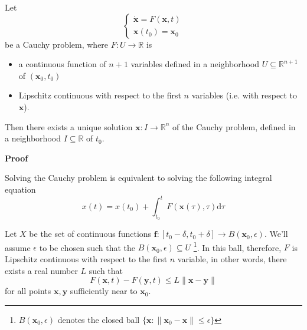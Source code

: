 \documentclass[12pt]{article}
\def\reals{\mathbb{R}}
\def\v#1{\mathbf{#1}}
\def\vdot#1{\mathbf{\dot{#1}}}
\def\d{\mathrm{d}}
\def\norm#1{\|#1\|}
\def\eps{\epsilon}
\begin{document}
Let
$$\begin{cases}\vdot x = F(\v x, t) \\ \v x(t_0) = \v x_0\end{cases}$$
be a Cauchy problem, where $F : U \to \reals$ is
\begin{itemize}
\item a continuous function of $n+1$ variables defined in a neighborhood $U \subseteq \reals^{n+1}$ of $(\v x_0, t_0)$
\item Lipschitz continuous with respect to the first $n$ variables (i.e. with respect to $\v x$).
\end{itemize}

Then there exists a unique solution $\v x : I \to \reals^n$ of the Cauchy problem, defined in a neighborhood $I \subseteq \reals$ of $t_0$.

{\bf Proof}

Solving the Cauchy problem is equivalent to solving the following integral equation
$$x(t) = x(t_0) + \int_{t_0}^{t} F(\v x(\tau), \tau) \d\tau$$

Let $X$ be the set of continuous functions $\v f : [t_0 - \delta, t_0 + \delta] \to B(\v x_0, \eps)$. We'll assume $\eps$ to be chosen such that the $B(\v x_0, \eps) \subseteq U$ \footnote{$B(\v x_0, \eps)$ denotes the closed ball $\{ \v x : \norm{\v x_0 - \v x} \leq \eps \}$}. In this ball, therefore, $F$ is Lipschitz continuous with respect to the first $n$ variable, in other words, there exists a real number $L$ such that
$${F(\v x, t) - F(\v y, t)} \leq L\norm{\v x - \v y}$$
for all points $\v x, \v y$ sufficiently near to $\v x_0$.
\end{document}
